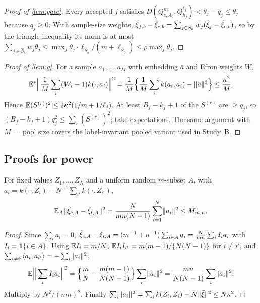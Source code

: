 \documentclass[11pt,a4paper]{article}
\begin{document}
\begin{proof}[Proof of \cref{lem:gate}]
Every accepted $j$ satisfies $D(Q^m_{c,A_b},Q^{\ell_j}_{h_j})<\theta_j-q_j\le\theta_j$ because $q_j\ge0$. With sample-size weights, $\hat\xi_{f,b}-\hat\xi_{c,b}=\sum_{j\in\hat S_b}w_j(\hat\xi_j-\hat\xi_{c,b})$, so by the triangle inequality its norm is at most $\sum_{j\in\hat S_b}w_j\theta_j\le\max_j\theta_j\cdot\ell_{\hat S_b}/(m+\ell_{\hat S_b})\le\rho\max_j\theta_j$.
\end{proof}

\begin{proof}[Proof of \cref{lem:q}]
For a sample $a_1,\dots,a_M$ with embedding $\bar a$ and Efron weights $W$,
\[
\mathbb{E}^\ast\Big\|\frac1M\sum_i(W_i-1)k(\cdot,a_i)\Big\|^2=\frac1M\Big\{\frac1M\sum_ik(a_i,a_i)-\lVert \bar a\rVert^2\Big\}\le\frac{\kappa^2}M .
\] Hence $\mathbb{E} (S^{(r)})^2\le2\kappa^2(1/m+1/\ell_j)$. At least $B_f-k_f+1$ of the $S^{(r)}$ are $\ge q_j$, so $(B_f-k_f+1)q_j^2\le\sum_r(S^{(r)})^2$; take expectations. The same argument with $M=$ pool size covers the label-invariant pooled variant used in Study~B.
\end{proof}

\subsection{Proofs for power}\label{app:power}

\begin{lemma}\label{lem:perm}
For fixed values $Z_1,\dots,Z_N$ and a uniform random $m$-subset $A$, with $a_i=k(\cdot,Z_i)-N^{-1}\sum_{i'}k(\cdot,Z_{i'})$,
\begin{equation}\label{eq:perm-identity}
\mathbb{E}_A\lVert \hat\xi_{c,A}-\hat\xi_{t,A}\rVert^2=\frac{N}{mn(N-1)}\sum_{i=1}^N\lVert a_i\rVert^2\le M_{m,n}.
\end{equation}
\end{lemma}
\begin{proof}
Since $\sum_ia_i=0$, $\hat\xi_{c,A}-\hat\xi_{t,A}=(m^{-1}+n^{-1})\sum_{i\in A}a_i=\frac{N}{mn}\sum_iI_ia_i$ with $I_i=\mathbf{1}\{i\in A\}$. Using $\mathbb{E} I_i=m/N$, $\mathbb{E} I_iI_{i'}=m(m-1)/\{N(N-1)\}$ for $i\ne i'$, and $\sum_{i\ne i'}\langle a_i, a_{i'}\rangle=-\sum_i\lVert a_i\rVert^2$,
\[
\mathbb{E}\Big\|\sum_iI_ia_i\Big\|^2=\Big\{\frac mN-\frac{m(m-1)}{N(N-1)}\Big\}\sum_i\lVert a_i\rVert^2=\frac{mn}{N(N-1)}\sum_i\lVert a_i\rVert^2 .
\]
Multiply by $N^2/(mn)^2$. Finally $\sum_i\lVert a_i\rVert^2=\sum_ik(Z_i,Z_i)-N\lVert \bar\xi\rVert^2\le N\kappa^2$.
\end{proof}
\end{document}
